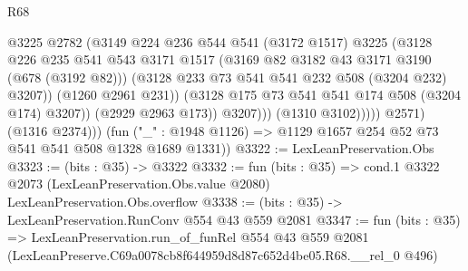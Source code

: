 \begin{lexlean}{R68}
\begin{coremodule}
                              @3225
                              @2782
                              (@3149
                                @224
                                @236
                                @544
                                @541
                                (@3172 @1517)
                                @3225
                                (@3128
                                  @226
                                  @235
                                  @541
                                  @543
                                  @3171
                                  @1517
                                  (@3169 @82 @3182 @43 @3171 @3190 (@678 (@3192 @82)))
                                  (@3128 @233 @73 @541 @541 @232 @508 (@3204 @232) @3207))
                                (@1260 @2961 @231))
                              (@3128 @175 @73 @541 @541 @174 @508 (@3204 @174) @3207))
                            (@2929 @2963 @173))
                          @3207)))
                    (@1310 @3102)))))
            @2571)
          (@1316 @2374)))
      (fun ("_" : @1948 @1126) => @1129 @1657 @254 @52 @73 @541 @541 @508 @1328 @1689 @1331))
@3322 := LexLeanPreservation.Obs
@3323 := (bits : @35) -> @3322
@3332 := fun (bits : @35) =>
  cond.{1} @3322 @2073 (LexLeanPreservation.Obs.value @2080) LexLeanPreservation.Obs.overflow
@3338 := (bits : @35) -> LexLeanPreservation.RunConv @554 @43 @559 @2081
@3347 := fun (bits : @35) =>
  LexLeanPreservation.run_of_funRel
    @554
    @43
    @559
    @2081
    (LexLeanPreserve.C69a0078cb8f644959d8d87c652d4be05.R68.__rel_0 @496)
\end{coremodule}
\end{lexlean}
